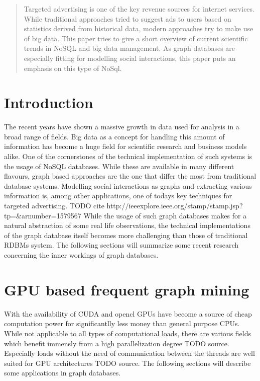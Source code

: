\documentclass{sig-alternate}
\begin{document}
\maketitle
\begin{abstract}
Targeted advertising is one of the key revenue sources 
for internet services. While traditional approaches tried
to suggest ads to users based on statistics derived from historical data,
modern approaches try to make use of big data.
This paper tries to give a short overview of current scientific trends 
in NoSQL and big data management. As graph databases are especially fitting for 
modelling social interactions, this paper puts an emphasis on this type of NoSql.
\end{abstract}



\section{Introduction}
The recent years have shown a massive growth in data 
used for analysis in a broad range of fields.
Big data as a concept for handling this amount of information
has become a huge field for scientific research and 
business models alike. One of the cornerstones of the technical
implementation of such systems is the usage of NoSQL databases.
While these are available in many different flavours, graph based approaches
are the one that differ the most from traditional database systems.
Modelling social interactions as graphs and extracting various information
is, among other applications, one of todays key techniques for targeted advertising. TODO cite http://ieeexplore.ieee.org/stamp/stamp.jsp?tp=&arnumber=1579567
While the usage of such graph databases makes for a natural abstraction
of some real life observations, the technical implementations
of the graph database itself becomes more challenging than those of
traditional RDBMs system.
The following sections will summarize some recent research concerning 
the inner workings of graph databases.

\section{GPU based frequent graph mining}
With the availability of CUDA and opencl GPUs have become
a source of cheap computation power for significantlly less money 
than general purpose CPUs. While not applicable to all types
of computational loads, there are various fields which benefit 
immensly from a high parallelization degree TODO source.
Especially loads without the need of communication between the 
threads are well suited for GPU architectures TODO source.
The following sections will describe some applications in graph databases.
\end{document}
